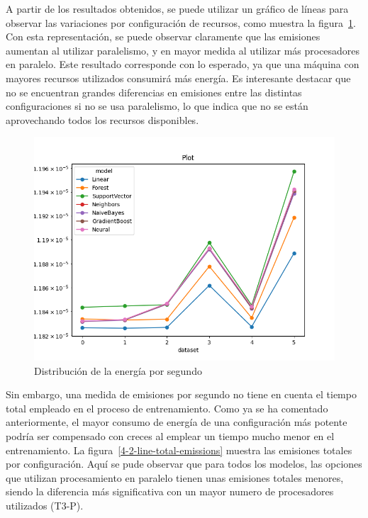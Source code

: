 A partir de los resultados obtenidos, se puede utilizar un gráfico de líneas para observar las variaciones por configuración de recursos, como muestra la figura~\ref{fig:4-2-line-energy-per-second}. Con esta representación, se puede observar claramente que las emisiones aumentan al utilizar paralelismo, y en mayor medida al utilizar más procesadores en paralelo. Este resultado corresponde con lo esperado, ya que una máquina con mayores recursos utilizados consumirá más energía. Es interesante destacar que no se encuentran grandes diferencias en emisiones entre las distintas configuraciones si no se usa paralelismo, lo que indica que no se están aprovechando todos los recursos disponibles.

\begin{figure}[H]
  \centerline{
     \includegraphics[width=\textwidth, keepaspectratio]{img/graph/2-line-energy-p-s.png}
  }
  \caption{Distribución de la energía por segundo}
  \label{fig:4-2-line-energy-per-second}
\end{figure}

Sin embargo, una medida de emisiones por segundo no tiene en cuenta el tiempo total empleado en el proceso de entrenamiento. Como ya se ha comentado anteriormente, el mayor consumo de energía de una configuración más potente podría ser compensado con creces al emplear un tiempo mucho menor en el entrenamiento. La figura~\ref{4-2-line-total-emissions} muestra las emisiones totales por configuración. Aquí se pude observar que para todos los modelos, las opciones que utilizan procesamiento en paralelo tienen unas emisiones totales menores, siendo la diferencia más significativa con un mayor numero de procesadores utilizados (T3-P).


